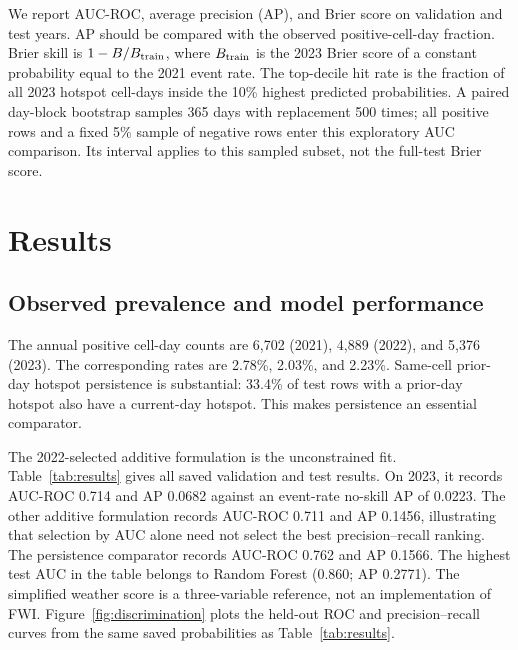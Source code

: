 \documentclass[conference]{IEEEtran}
\begin{document}
We report AUC-ROC, average precision (AP), and Brier score on validation and test years. AP should be compared with the observed positive-cell-day fraction. Brier skill is $1-B/B_{\rm train}$, where $B_{\rm train}$ is the 2023 Brier score of a constant probability equal to the 2021 event rate. The top-decile hit rate is the fraction of all 2023 hotspot cell-days inside the 10\% highest predicted probabilities. A paired day-block bootstrap samples 365 days with replacement 500 times; all positive rows and a fixed 5\% sample of negative rows enter this exploratory AUC comparison. Its interval applies to this sampled subset, not the full-test Brier score.

\section{Results}
\subsection{Observed prevalence and model performance}
The annual positive cell-day counts are 6,702 (2021), 4,889 (2022), and 5,376 (2023). The corresponding rates are 2.78\%, 2.03\%, and 2.23\%. Same-cell prior-day hotspot persistence is substantial: 33.4\% of test rows with a prior-day hotspot also have a current-day hotspot. This makes persistence an essential comparator.

The 2022-selected additive formulation is the unconstrained fit. Table~\ref{tab:results} gives all saved validation and test results. On 2023, it records AUC-ROC 0.714 and AP 0.0682 against an event-rate no-skill AP of 0.0223. The other additive formulation records AUC-ROC 0.711 and AP 0.1456, illustrating that selection by AUC alone need not select the best precision--recall ranking. The persistence comparator records AUC-ROC 0.762 and AP 0.1566. The highest test AUC in the table belongs to Random Forest (0.860; AP 0.2771). The simplified weather score is a three-variable reference, not an implementation of FWI. Figure~\ref{fig:discrimination} plots the held-out ROC and precision--recall curves from the same saved probabilities as Table~\ref{tab:results}.
\end{document}
